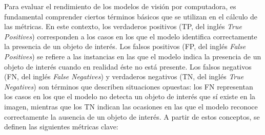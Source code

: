 Para evaluar el rendimiento de los modelos de visión por computadora, es fundamental comprender ciertos términos básicos que se utilizan en el cálculo de las métricas. En este contexto, los verdaderos positivos (TP, del inglés \textit{True Positives}) corresponden a los casos en los que el modelo identifica correctamente la presencia de un objeto de interés. Los falsos positivos (FP, del inglés \textit{False Positives}) se refiere a las instancias en las que el modelo indica la presencia de un objeto de interés cuando en realidad éste no está presente. Los falsos negativos (FN, del inglés \textit{False Negatives}) y verdaderos negativos (TN, del inglés \textit{True Negatives}) son términos que describen situaciones opuestas: los FN representan los casos en los que el modelo no detecta un objeto de interés que sí existe en la imagen, mientras que los TN indican las ocasiones en las que el modelo reconoce correctamente la ausencia de un objeto de interés. A partir de estos conceptos, se definen las siguientes métricas clave:

